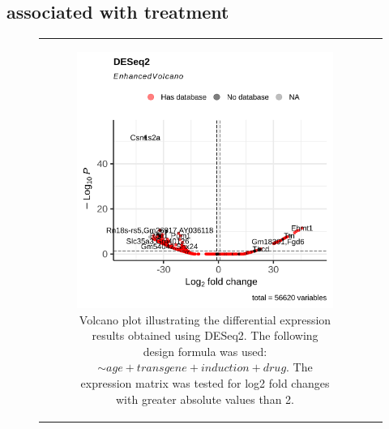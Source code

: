 \subsection{ associated with  treatment}

\begin{figure}[H] \begin{tabular}{cc}
        \begin{subfigure}{0.5\textwidth} \centering

            \includegraphics[width=\linewidth]{chapters/4_results_and_discussion/figures/dea/deseq2/tamoxifen/volcano.png}
            \caption{Volcano plot illustrating the differential expression
                results obtained using DESeq2.
                The following design formula was used: $\sim age + transgene + induction +
                    drug$.
                The expression matrix was tested for log2 fold changes with greater absolute
                values than 2.
            }
            \label{fig:tamoxifen_volcano_deseq2}
        \end{subfigure}
        \begin{subfigure}{0.5\textwidth}
            \centering


\end{subfigure}
\end{tabular}
\end{figure}
